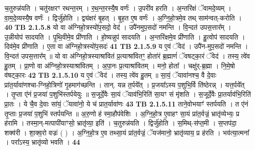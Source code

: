 \documentclass[17pt]{extarticle}
\begin{document}
                  च॒तुरुन्न॑यति । चतु॑रक्षरꣳ रथन्त॒रम् । र॒थ॒न्त॒रस्यै॒ष वर्णः॑ । उ॒परी॑व हरति । अ॒न्तरि॑क्षं ॅवामदे॒व्यम् । वा॒म॒दे॒व्यस्यै॒ष वर्णः॑ । द्विर्जु॑होति । द्व्य॑क्षरं बृ॒हत् । बृ॒ह॒त ए॒ष वर्णः॑ । अ॒ग्नि॒हो॒त्रमे॒व तथ् साम॑न्वत्-करोति । \textbf{ 40} \newline
                  \newline
                                \textbf{ TB 2.1.5.8} \newline
                  यो वा अ॑ग्निहो॒त्रस्यो॑प॒सदो॒ वेद॑ । उपै॑नमुप॒सदो॑ नमन्ति । वि॒न्दत॑ उपस॒त्तार᳚म् । उ॒न्नीयोप॑ सादयति । पृ॒थि॒वीमे॒व प्री॑णाति । हो॒ष्यन्नुप॑ सादयति । अ॒न्तरि॑क्षमे॒व प्री॑णाति । हु॒त्वोप॑ सादयति । दिव॑मे॒व प्री॑णाति । ए॒ता वा अ॑ग्निहो॒त्रस्यो॑प॒सदः॑ \textbf{ 41} \newline
                  \newline
                                \textbf{ TB 2.1.5.9} \newline
                  य ए॒वं ॅवेद॑ । उपै॑न-मुप॒सदो॑ नमन्ति । वि॒न्दत॑ उपस॒त्तार᳚म् ॥ यो वा अ॑ग्निहो॒त्रस्याश्रा॑वितं प्र॒त्याश्रा॑वितꣳ॒॒ होता॑रं ब्र॒ह्माणं॑ ॅवषट्का॒रं ॅवेद॑ । तस्य॒ त्वे॑व हु॒तम् । प्रा॒णो वा अ॑ग्निहो॒त्रस्याश्रा॑वितम् । अ॒पा॒नः प्र॒त्याश्रा॑वितम् । मनो॒ होता᳚ । चक्षु॑र्-ब्र॒ह्मा । नि॒मे॒षो व॑षट्का॒रः \textbf{ 42} \newline
                  \newline
                                \textbf{ TB 2.1.5.10} \newline
                  य ए॒वं ॅवेद॑ । तस्य॒ त्वे॑व हु॒तम् ॥ सा॒यं॒ ॅयावा॑नश्च॒ वै दे॒वाः प्रा॑त॒र्यावा॑णश्चा-ग्निहो॒त्रिणो॑ गृ॒हमाग॑च्छन्ति । तान्. यन्न त॒र्पये᳚त् । प्र॒जया᳚ऽस्य प॒शुभि॒र्वि ति॑ष्ठेरन्न् । यत्त॒र्पये᳚त् । तृ॒प्ता ए॑नं प्र॒जया॑ प॒शुभि॑स्तर्पयेयुः ॥ स॒जूर्दे॒वैः सा॒यं ॅयाव॑भि॒रिति॑ सा॒यꣳ सं मृ॑शति । स॒जूर्दे॒वैः प्रा॒तर्याव॑भि॒रिति॑ प्रा॒तः । ये चै॒व दे॒वाः सा॑यं॒ ॅयावा॑नो॒ ये च॑ प्रात॒र्यावा॑णः \textbf{ 43} \newline
                  \newline
                                \textbf{ TB 2.1.5.11} \newline
                  ताने॒वोभयाꣳ॑ स्तर्पयति । त ए॑नं तृ॒प्ताः प्र॒जया॑ प॒शुभि॑ स्तर्पयन्ति ॥ अ॒रु॒णो ह॑ स्मा॒हौप॑वेशिः । अ॒ग्नि॒हो॒त्र ए॒वाहꣳ सा॒यं प्रा॑त॒र्वज्रं॒ भ्रातृ॑व्येभ्यः॒ प्र ह॑रामि । तस्मा॒न्-मत्पापी॑याꣳसो॒ भ्रातृ॑व्या॒ इति॑ । च॒तुरुन्न॑यति । द्विर्जु॑होति । स॒मिथ्-स॑प्त॒मी । स॒प्तप॑दा॒ शक्व॑री । शा॒क्व॒रो वज्रः॑ ( ) । अ॒ग्नि॒हो॒त्र ए॒व तथ्सा॒यं प्रा॑त॒र्वज्रं॒ ॅयज॑मानो॒ भ्रातृ॑व्याय॒ प्र ह॑रति । भव॑त्या॒त्मना᳚ । परा᳚ऽस्य॒ भ्रातृ॑व्यो भवति । \textbf{ 44} \newline
\end{document}
